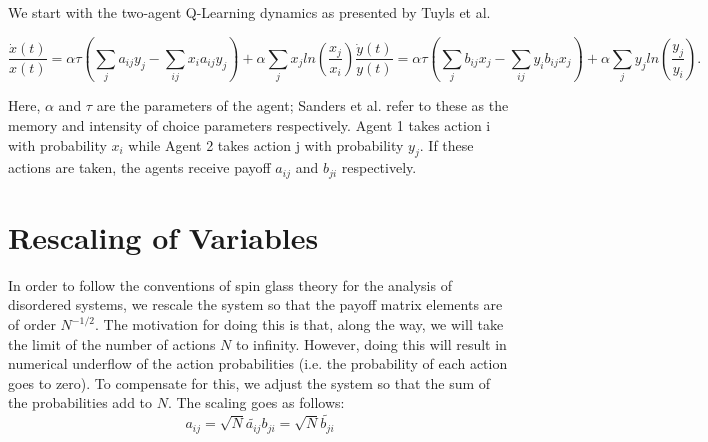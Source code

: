 \documentclass[.../main.tex]{subfiles}
\begin{document}
	We start with the two-agent Q-Learning dynamics as presented by Tuyls et al.

	\begin{subequations}
	\label{eqn::EOM}
		\begin{equation}
			\frac{\dot{x}(t)}{x(t)} = \alpha \tau (\sum_{j} a_{ij} y_j - \sum_{i j} x_i a_{ij} y_j)
			+ \alpha \sum_j x_j ln(\frac{x_j}{x_i}) 
		\end{equation}
		\begin{equation}
			\frac{\dot{y}(t)}{y(t)} = \alpha \tau (\sum_{j} b_{ij} x_j - \sum_{i j} y_i b_{ij} x_j)
			+ \alpha \sum_j y_j ln(\frac{y_j}{y_i}).
		\end{equation}
	\end{subequations}

	Here, $\alpha$ and $\tau$ are the parameters of the agent; Sanders et al. refer to these as the memory and intensity of choice parameters respectively. Agent 1 takes action i with probability $x_i$ while Agent 2 takes action j with probability $y_j$. If these actions are taken, the agents receive payoff $a_{ij}$ and $b_{ji}$ respectively. 

	\section{Rescaling of Variables} %
	\label{sub:rescaling_of_variables}
	
		In order to follow the conventions of spin glass
                theory for the analysis of disordered systems, we
                rescale the system so that the payoff matrix elements
                are of order $N^{-1/2}$. The motivation for doing this
                is that, along the way, we will take the limit of the
                number of actions $N$ to infinity. However, doing this
                will result in numerical underflow of the action
                probabilities (i.e. the probability of each action
                goes to zero). To compensate for this, we adjust the
                system so that the sum of the probabilities add to
                $N$. The scaling goes as follows:
%
	\begin{subequations}
		\begin{equation}
			a_{ij} = \sqrt{N} \tilde{a_{ij}}
		\end{equation}
		\begin{equation}
			b_{ji} = \sqrt{N} \tilde{b_{ji}}
		\end{equation}
	\end{subequations}
\end{document}
